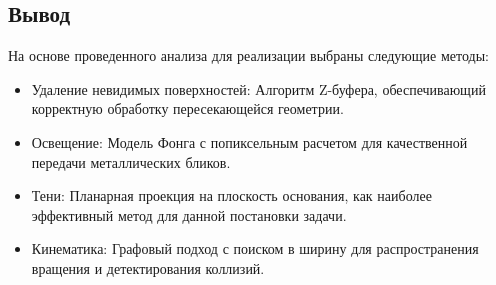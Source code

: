 \subsection*{Вывод}

На основе проведенного анализа для реализации выбраны следующие методы:
\begin{itemize}
	\item Удаление невидимых поверхностей: Алгоритм Z-буфера, обеспечивающий корректную обработку пересекающейся геометрии.
	\item Освещение: Модель Фонга с попиксельным расчетом для качественной передачи металлических бликов.
	\item Тени: Планарная проекция на плоскость основания, как наиболее эффективный метод для данной постановки задачи.
	\item Кинематика: Графовый подход с поиском в ширину для распространения вращения и детектирования коллизий.
\end{itemize}
